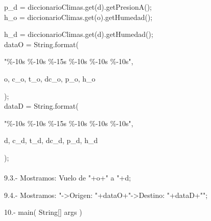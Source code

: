 \documentclass[30pt]{article}
\theoremstyle{definition}
\begin{document}
  \hspace{3cm} p\_d = diccionarioClimas.get(d).getPresionA();\\

  \hspace{3cm} h\_o = diccionarioClimas.get(o).getHumedad();
  
  \hspace{3cm} h\_d = diccionarioClimas.get(d).getHumedad();\\
  
  \hspace{3cm} dataO = String.format(
  
  \hspace{3cm} "\%-10s \%-10s \%-15s \%-10s \%-10s \%-10s",
  
    \hspace{3cm} o, \hspace{0.5cm} c\_o, \hspace{0.5cm}t\_o, \hspace{0.5cm}dc\_o, \hspace{0.5cm}p\_o, \hspace{0.5cm}h\_o
    
  \hspace{3cm} );\\

  \hspace{3cm} dataD = String.format(
  
  \hspace{3cm} "\%-10s \%-10s \%-15s \%-10s \%-10s \%-10s",
  
  \hspace{3cm} d, \hspace{0.5cm} c\_d, \hspace{0.5cm}t\_d, \hspace{0.5cm}dc\_d, \hspace{0.5cm}p\_d,   \hspace{0.5cm}h\_d
    
    \hspace{3cm} );\\ \\
    
    \hspace{2cm} 9.3.- Mostramos: Vuelo de "+o+" a "+d;
    
    \hspace{2cm} 9.4.- Mostramos: "->Origen: "+dataO+"\n->Destino: "+dataD+"\n";
    
    \hspace{1cm} 10.- main( String[] args )\\
    
\end{document}
